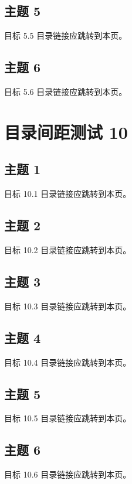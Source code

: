 \documentclass[navigation=false]{campusbeamer}
\begin{document}
\subsection{主题 5}
\begin{frame}{目标 5.5}
目录链接应跳转到本页。
\end{frame}
\subsection{主题 6}
\begin{frame}{目标 5.6}
目录链接应跳转到本页。
\end{frame}
\setcounter{section}{9}
\section{目录间距测试 10}
\sectioncoverpage[primary]{}
\subsection{主题 1}
\begin{frame}{目标 10.1}
目录链接应跳转到本页。
\end{frame}
\subsection{主题 2}
\begin{frame}{目标 10.2}
目录链接应跳转到本页。
\end{frame}
\subsection{主题 3}
\begin{frame}{目标 10.3}
目录链接应跳转到本页。
\end{frame}
\subsection{主题 4}
\begin{frame}{目标 10.4}
目录链接应跳转到本页。
\end{frame}
\subsection{主题 5}
\begin{frame}{目标 10.5}
目录链接应跳转到本页。
\end{frame}
\subsection{主题 6}
\begin{frame}{目标 10.6}
目录链接应跳转到本页。
\end{frame}
\end{document}
